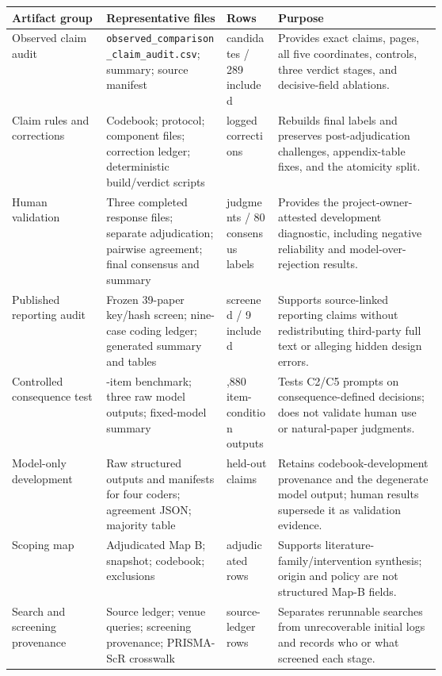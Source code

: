 \begin{table}[t]
\centering
\scriptsize
\renewcommand{\arraystretch}{0.9}
\begin{tabularx}{\linewidth}{>{\raggedright\arraybackslash}p{0.22\linewidth}>{\raggedright\arraybackslash}p{0.29\linewidth}>{\raggedright\arraybackslash}p{0.12\linewidth}X}
\toprule
\textbf{Artifact group} & \textbf{Representative files} & \textbf{Rows} & \textbf{Purpose} \\
\midrule
Observed claim audit & \texttt{observed\_comparison\_claim\_audit.csv}; summary; source manifest & 291 candidates / 289 included & Provides exact claims, pages, all five coordinates, controls, three verdict stages, and decisive-field ablations. \\
Claim rules and corrections & Codebook; protocol; component files; correction ledger; deterministic build/verdict scripts & 23 logged corrections & Rebuilds final labels and preserves post-adjudication challenges, appendix-table fixes, and the atomicity split. \\
Human validation & Three completed response files; separate adjudication; pairwise agreement; final consensus and summary & 240 judgments / 80 consensus labels & Provides the project-owner-attested development diagnostic, including negative reliability and model-over-rejection results. \\
Published reporting audit & Frozen 39-paper key/hash screen; nine-case coding ledger; generated summary and tables & 39 screened / 9 included & Supports source-linked reporting claims without redistributing third-party full text or alleging hidden design errors. \\
Controlled consequence test & 480-item benchmark; three raw model outputs; fixed-model summary & 2,880 item-condition outputs & Tests C2/C5 prompts on consequence-defined decisions; does not validate human use or natural-paper judgments. \\
Model-only development & Raw structured outputs and manifests for four coders; agreement JSON; majority table & 86 held-out claims & Retains codebook-development provenance and the degenerate model output; human results supersede it as validation evidence. \\
Scoping map & Adjudicated Map B; snapshot; codebook; exclusions & 342 adjudicated rows & Supports literature-family/intervention synthesis; origin and policy are not structured Map-B fields. \\
Search and screening provenance & Source ledger; venue queries; screening provenance; PRISMA-ScR crosswalk & 9 source-ledger rows & Separates rerunnable searches from unrecoverable initial logs and records who or what screened each stage. \\

\end{tabularx}
\end{table}
